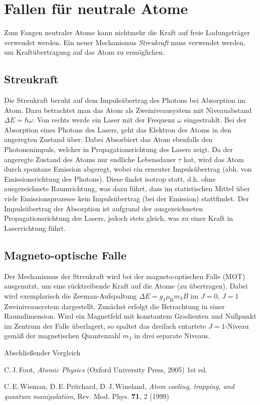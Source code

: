 \documentclass[twocolumn]{revtex4}
\begin{document}
\section{Fallen für neutrale Atome}

Zum Fangen neutraler Atome kann nichtmehr die Kraft auf freie Ladungsträger verwendet werden.
Ein neuer Mechanismus \emph{Streukraft} muss verwendet werden, um Kraftübertragung auf das Atom zu ermöglichen.

\subsection{Streukraft}
Die Streukraft beruht auf dem Impulsübertrag des Photons bei Absorption im Atom.
Dazu betrachtet man das Atom als Zweiniveausystem mit Niveauabstand $\Delta E = \hbar \omega$. Von rechts werde ein Laser mit der Frequenz $\omega$ eingestrahlt. Bei der Absorption eines Photons des Lasers, geht das Elektron des Atoms in den angeregten Zustand über. Dabei Absorbiert das Atom ebenfalls den Photonenimpuls, welcher in Propagationsrichtung des Lasers zeigt.
Da der angeregte Zustand des Atoms nur endliche Lebensdauer $\tau$ hat, wird das Atom durch spontane Emission abgeregt, wobei ein erneuter Impulsübertrag (abh. von Emissionsrichtung des Photons).
Diese findet isotrop statt, d.h. ohne ausgezeichnete Raumrichtung, was dazu führt, dass im statistischen Mittel über viele Emissionsprozesse kein Impulsübertrag (bei der Emission) stattfindet.
Der Impulsübertrag der Absorption ist aufgrund der ausgezeichneten Propagationsrichtung des Lasers, jedoch stets gleich, was zu einer Kraft in Laserrichtung führt.

\subsection{Magneto-optische Falle}
Der Mechanismus der Streukraft wird bei der magneto-optischen Falle (MOT)  ausgenutzt, um eine rücktreibende Kraft auf die Atome (zu übertragen).
Dabei wird exemplarisch die Zeeman-Aufspaltung $\Delta E = g_\mathrm{J} \mu_\mathrm{B} m_\mathrm{J} B$ im $J=0$, $J=1$ Zweiniveausystem dargestellt.
Zunächst erfolgt die Betrachtung in einer Raumdimension.
Wird ein Magnetfeld mit konstantem Gradienten und Nullpunkt im Zentrum der Falle überlagert, so spaltet das dreifach entartete $J=1$-Niveau gemäß der magnetischen Quantenzahl $m_\mathrm{J}$ in drei separate Niveaus.


Abschließender Vergleich


\begin{thebibliography}{}
C.\,J.\,Foot, {\it Atomic Physics} (Oxford University Press, 2005) 1st ed.

C.\,E.\,Wieman, D.\,E.\,Pritchard, D.\,J.\,Wineland, {\it Atom cooling, trapping, and quantum manipulation}, Rev. Mod. Phys. \textbf{71}, 2 (1999)

\end{thebibliography}
\end{document}
